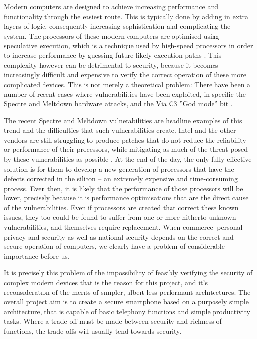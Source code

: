         Modern computers are designed to achieve increasing performance and functionality through the easiest route.
        This is typically done by adding in extra layers of logic, consequently increasing sophistication and complicating the system.
        The processors of these modern computers are optimised using speculative execution, which is a technique used by high-speed processors in order to increase performance by guessing future likely execution paths \citep{RN16}.
        This complexity however can be detrimental to security, because it becomes increasingly difficult and expensive to verify the correct operation of these more complicated devices.
        This is not merely a theoretical problem: There have been a number of recent cases where vulnerabilities have been exploited, in specific the Spectre and Meltdown hardware attacks, and the Via C3 ''God mode'' bit \citep{ViaC3x865:online}.

        The recent Spectre \citep{RN16} and Meltdown \citep{RN3} vulnerabilities are headline examples of this trend and the difficulties that such vulnerabilities create.
        Intel and the other vendors are still struggling to produce patches that do not reduce the reliability or performance of their processors, while mitigating as much of the threat posed by these vulnerabilities as possible \citep{Ifatfirs66:online}.
        At the end of the day, the only fully effective solution is for them to develop a new generation of processors that have the defects corrected in the silicon – an extremely expensive and time-consuming process.
        Even then, it is likely that the performance of those processors will be lower, precisely because it is performance optimisations that are the direct cause of the vulnerabilities.
        Even if processors are created that correct these known issues, they too could be found to suffer from one or more hitherto unknown vulnerabilities, and themselves require replacement.
        When commerce, personal privacy and security as well as national security depends on the correct and secure operation of computers, we clearly have a problem of considerable importance before us.

        It is precisely this problem of the impossibility of feasibly verifying the security of complex modern devices that is the reason for this project, and it's reconsideration of the merits of simpler, albeit less performant architectures.
The overall project aim is to create a secure smartphone based on a purposely simple architecture, that is capable of basic telephony functions and simple productivity tasks.
Where a trade-off must be made between security and richness of functions, the trade-offs will usually tend towards security.


